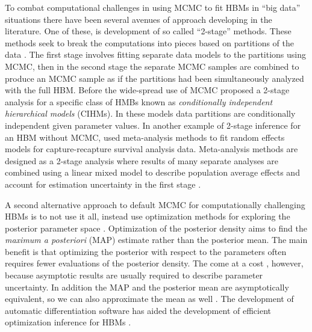 \documentclass[12pt]{article}
\begin{document}
To combat computational challenges in using MCMC to fit HBMs in ``big data'' situations there have been several avenues of approach  developing in the literature. One of these, is development of so called ``2-stage'' methods. These methods seek to break the computations into pieces based on partitions of the data \citep{goudie2019joining, hooten2016hierarchical,hooten2018prior,lunn2013fully,mesquita2020embarrassingly}. The first stage involves fitting separate data models to the partitions using MCMC, then in the second stage the separate MCMC samples are combined to produce an MCMC sample as if the partitions had been simultaneously analyzed with the full HBM. Before the wide-spread use of MCMC \cite{kass1989approximate} proposed a 2-stage analysis for a specific class of HMBs known as {\it conditionally independent hierarchical models} (CIHMs). In these models data partitions are conditionally independent given parameter values. In another example of 2-stage inference for an HBM without MCMC, \citet{burnham2002evaluation} used meta-analysis methods to fit random effects models for capture-recapture survival analysis data. Meta-analysis methods are designed as a 2-stage analysis where results of many separate analyses are combined using a linear mixed model to describe population average effects and account for estimation uncertainty in the first stage \citep{gasparrini2012multivariate,higgins2009re}. 

A second alternative approach to default MCMC for computationally challenging HBMs is to not use it all, instead use  optimization methods for exploring the posterior parameter space \citep{green2015bayesian}. Optimization of the posterior density aims to find the  {\it maximum a posteriori} (MAP) estimate rather than the posterior mean. The main benefit is that optimizing the posterior with respect to the parameters often requires fewer evaluations of the posterior density. The come at a cost , however, because asymptotic results are usually required to describe parameter uncertainty. In addition the MAP and the posterior mean are asymptotically equivalent, so we can also approximate the mean as well \citep{van2000asymptotic}. The development of automatic differentiation software has aided the development of efficient optimization inference for HBMs \citep{kristensen2016tmb, skaug2006automatic}.
\end{document}
